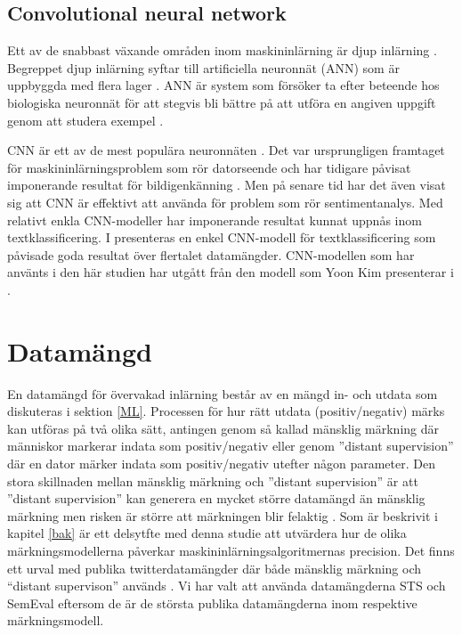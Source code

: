 \documentclass{kaumasters} %
\begin{document}
\subsection{Convolutional neural network}\label{bak:cnn}
Ett av de snabbast växande områden inom maskininlärning är djup inlärning \cite{TSAsurvey}. Begreppet djup inlärning syftar till artificiella neuronnät (ANN) som är uppbyggda med flera lager  \cite{cnn:001}. ANN är system som försöker ta efter beteende hos biologiska neuronnät för att stegvis bli bättre på att utföra en angiven uppgift genom att studera exempel \cite{wiki:015}. 

CNN är ett av de mest populära neuronnäten  \cite{cnn:001}. Det var ursprungligen framtaget för maskininlärningsproblem som rör datorseende och har tidigare påvisat imponerande resultat för bildigenkänning \cite{cnn:003, cnn:006}. Men på senare tid har det även visat sig att CNN är effektivt att använda för problem som rör sentimentanalys. Med relativt enkla CNN-modeller har imponerande resultat kunnat uppnås inom textklassificering.  I \cite{cnn:003} presenteras en enkel CNN-modell för textklassificering som påvisade goda resultat över flertalet datamängder. CNN-modellen som har använts i den här studien har utgått från den modell som Yoon Kim presenterar i \cite{cnn:003}.

\section{Datamängd} \label{DS}
En datamängd för övervakad inlärning består av en mängd in- och utdata som diskuteras i sektion \ref{ML}. Processen för hur rätt utdata (positiv/negativ) märks kan utföras på två olika sätt, antingen genom så kallad mänsklig märkning där människor markerar indata som positiv/negativ eller genom ''distant supervision'' där en dator märker indata som positiv/negativ utefter någon parameter. Den stora skillnaden mellan mänsklig märkning och ''distant supervision'' är att ''distant supervision'' kan generera en mycket större datamängd än mänsklig märkning men risken är större att märkningen blir felaktig \cite{TSAsurvey}. 
Som är beskrivit i kapitel \ref{bak} är ett delsytfte med denna studie att utvärdera hur de olika märkningsmodellerna påverkar maskininlärningsalgoritmernas precision. Det finns ett urval med publika twitterdatamängder där både mänsklig märkning och “distant supervison” används \cite{TSAsurvey}. Vi har valt att använda datamängderna STS \cite{sts:001} och SemEval \cite{SemEval:001} eftersom de är de största publika datamängderna inom respektive märkningsmodell.
\end{document}
